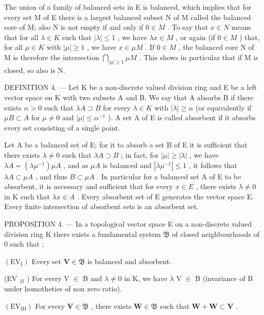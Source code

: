 The union of a family of balanced sets in E is balanced, which implies that for every set M of E there is a largest balanced subset N of M called the balanced core of M; also N is not empty if and only if \(0 \in M\) . To say that \(x \in N\) means that for all \(\lambda \in K\) such that \(|\lambda| \leqslant 1\) , we have \(\lambda x \in M\) , or again (if \(0 \in M\) ) that, for all \(\mu \in K\) with \(|\mu| \geqslant 1\) , we have \(x \in \mu M\) . If \(0 \in M\) , the balanced core N of M is therefore the intersection \(\bigcap_{|\mu| \geqslant 1} \mu M\) . This shows in particular that if M is closed, so also is N.

DEFINITION 4. --- Let K be a non-discrete valued division ring and E be a left vector space on K with two subsets A and B. We say that A absorbs B if there exists \(\alpha > 0\) such that \(\lambda A \supset B\) for every \(\lambda \in K\) with \(|\lambda| \geqslant \alpha\) (or equivalently if \(\mu B \subset A\) for \(\mu \neq 0\) and \(|\mu| \leqslant \alpha^{-1}\) ). A set A of E is called absorbent if it absorbs every set consisting of a single point.

Let A be a balanced set of E; for it to absorb a set B of E it is sufficient that there exists \(\lambda \neq 0\) such that \(\lambda A \supset B\) ; in fact, for \(|\mu| \geqslant |\lambda|\) , we have \(\lambda A = (\lambda \mu^{-1}) \mu A\) , and as \(\mu A\) is balanced and \(|\lambda \mu^{-1}| \leqslant 1\) , it follows that \(\lambda A \subset \mu A\) , and thus \(B \subset \mu A\) . In particular for a balanced set A of E to be absorbent, it is necessary and sufficient that for every \(x \in E\) , there exists \(\lambda \neq 0\) in K such that \(\lambda x \in A\) . Every absorbent set of E generates the vector space E. Every finite intersection of absorbent sets is an absorbent set.

PROPOSITION 4. --- In a topological vector space E on a non-discrete valued division ring K there exists a fundamental system \(\mathfrak{B}\) of closed neighbourhoods of 0 such that :

\((\mathrm{EV}_{\mathrm{I}})\) Every set \(\mathbf{V}\in \mathfrak{B}\) is balanced and absorbent.

(EV \(_{II}\) ) For every V \(\in\) B and \(\lambda \neq 0\) in K, we have \(\lambda\) V \(\in\) B (invariance of B under homotheties of non zero ratio).

\((\mathrm{EV}_{\mathrm{III}})\) For every \(\mathbf{V}\in \mathfrak{B}\) , there exists \(\mathbf{W}\in \mathfrak{B}\) such that \(\mathbf{W} + \mathbf{W}\subset \mathbf{V}\) .

